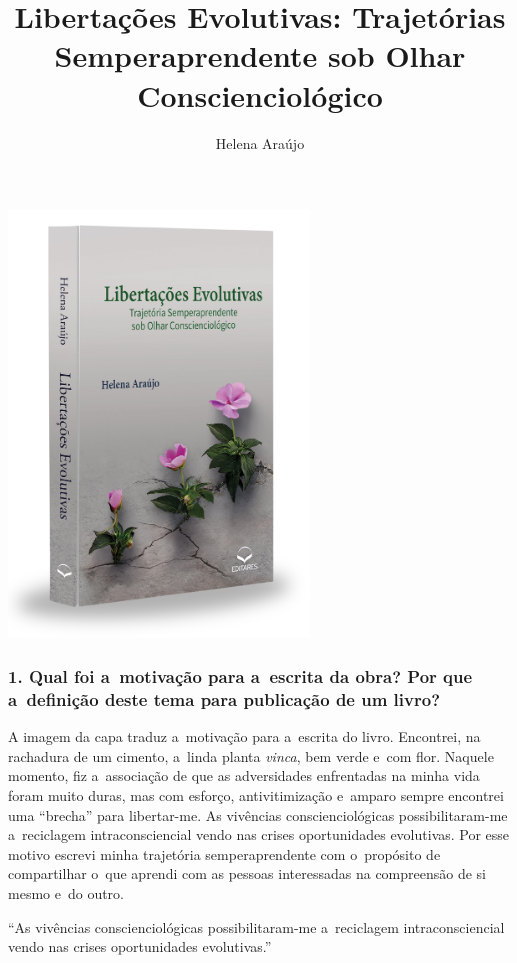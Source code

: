 \documentclass{gescons}
\author{Helena Araújo}
\title{Libertações Evolutivas: Trajetórias Semperaprendente sob Olhar Conscienciológico}
\begin{document}
    \makeentrevistatitle

    \begin{multicols}{2}

\begin{center}
    \includegraphics[width=8cm]{articles/entrevista/mockups/Helena_Araujo}
\end{center}


\subsubsection{1. Qual foi a~motivação para a~escrita da obra? Por que a~definição deste tema para publicação de um livro?}

A imagem da capa traduz a~motivação para a~escrita do livro. Encontrei, na rachadura de um cimento, a~linda planta \emph{vinca}, bem verde e~com flor. Naquele momento, fiz a~associação de que as adversidades enfrentadas na minha vida foram muito duras, mas com esforço, antivitimização e~amparo sempre encontrei uma ``brecha'' para libertar-me. As vivências conscienciológicas possibilitaram-me a~reciclagem intraconsciencial vendo nas crises oportunidades evolutivas. Por esse motivo escrevi minha trajetória semperaprendente com o~propósito de compartilhar o~que aprendi com as pessoas interessadas na compreensão de si mesmo e~do outro.

\begin{pullquote}
``As vivências conscienciológicas possibilitaram-me a~reciclagem intraconsciencial vendo nas crises oportunidades evolutivas.''
\end{pullquote}


\end{multicols}
\end{document}
